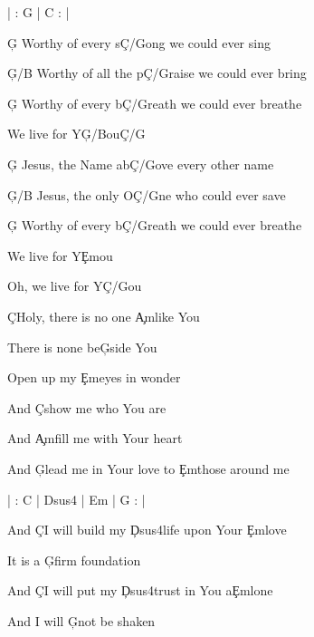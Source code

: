\documentclass[9pt]{extarticle}
\begin{document}
\bsong

\bi
| : G | C : |
\ei

\bv
\c{G} Worthy of every s\c{C/G}ong we could ever sing

\c{G/B} Worthy of all the p\c{C/G}raise we could ever bring

\c{G} Worthy of every b\c{C/G}reath we could ever breathe

We live for Y\c{G/B}ou\c{C/G}
\ev

\bv
\c{G} Jesus, the Name ab\c{C/G}ove every other name

\c{G/B} Jesus, the only O\c{C/G}ne who could ever save

\c{G} Worthy of every b\c{C/G}reath we could ever breathe

We live for Y\c{Em}ou

Oh, we live for Y\c{C/G}ou
\ev

\bc
\c{C}Holy, there is no one \c{Am}like You

There is none be\c{G}side You

Open up my \c{Em}eyes in wonder



And \c{C}show me who You are

And \c{Am}fill me with Your heart

And \c{G}lead me in Your love to \c{Em}those around me
\ec




\bin
| : C | Dsus4 | Em | G : |
\ein

\bb[2]
And \c{C}I will build my \c{Dsus4}life upon Your \c{Em}love

It is a \c{G}firm foundation

And \c{C}I will put my \c{Dsus4}trust in You a\c{Em}lone

And I will \c{G}not be shaken
\eb


\esong
\end{document}
